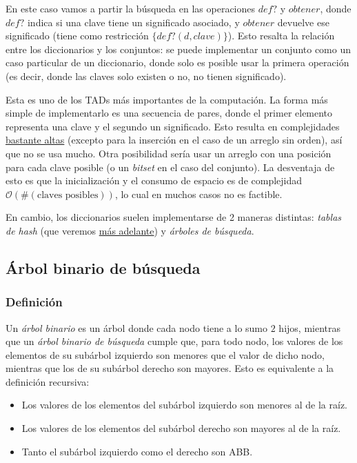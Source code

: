 \documentclass{article}
\newcommand{\BigO}[1]{{\mathcal{O}(#1)}}
\begin{document}
En este caso vamos a partir la búsqueda en las operaciones $def?$ y $obtener$, donde $def?$ indica si una clave tiene un significado asociado, y $obtener$ devuelve ese significado (tiene como restricción $\{def?(d, clave)\}$). Esto resalta la relación entre los diccionarios y los conjuntos: se puede implementar un conjunto como un caso particular de un diccionario, donde solo es posible usar la primera operación (es decir, donde las claves solo existen o no, no tienen significado).

Esta es uno de los TADs más importantes de la computación. La forma más simple de implementarlo es una secuencia de pares, donde el primer elemento representa una clave y el segundo un significado. Esto resulta en complejidades \hyperref[table-dict-complexities]{bastante altas} (excepto para la inserción en el caso de un arreglo sin orden), así que no se usa mucho. Otra posibilidad sería usar un arreglo con una posición para cada clave posible (o un \textit{bitset} en el caso del conjunto). La desventaja de esto es que la inicialización y el consumo de espacio es de complejidad $\BigO{\#(\text{claves posibles})}$, lo cual en muchos casos no es factible.


En cambio, los diccionarios suelen implementarse de 2 maneras distintas: \textit{tablas de hash} (que veremos \hyperref[sec-hash-tables]{más adelante}) y \textit{árboles de búsqueda}.

\subsection{Árbol binario de búsqueda}

\subsubsection{Definición}

Un \textit{árbol binario} es un árbol donde cada nodo tiene a lo sumo $2$ hijos, mientras que un \textit{árbol binario de búsqueda} cumple que, para todo nodo, los valores de los elementos de su subárbol izquierdo son menores que el valor de dicho nodo, mientras que los de su subárbol derecho son mayores. Esto es equivalente a la definición recursiva:
\begin{itemize}
    \item Los valores de los elementos del subárbol izquierdo son menores al de la raíz.
    \item Los valores de los elementos del subárbol derecho son mayores al de la raíz.
    \item Tanto el subárbol izquierdo como el derecho son ABB.
\end{itemize}
\end{document}
